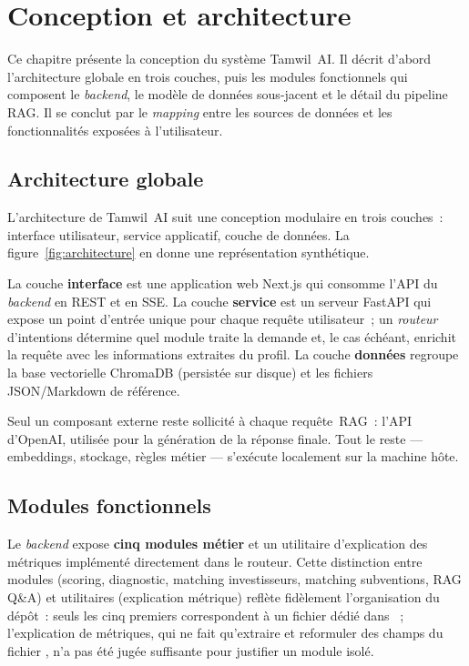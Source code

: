 \chapter{Conception et architecture}

Ce chapitre présente la conception du système Tamwil~AI. Il décrit d'abord l'architecture globale en trois couches, puis les modules fonctionnels qui composent le \textit{backend}, le modèle de données sous-jacent et le détail du pipeline \ac{RAG}. Il se conclut par le \textit{mapping} entre les sources de données et les fonctionnalités exposées à l'utilisateur.

\section{Architecture globale}

L'architecture de Tamwil~AI suit une conception modulaire en trois couches~: interface utilisateur, service applicatif, couche de données. La figure~\ref{fig:architecture} en donne une représentation synthétique.



La couche \textbf{interface} est une application web Next.js qui consomme l'\ac{API} du \textit{backend} en REST et en \ac{SSE}. La couche \textbf{service} est un serveur FastAPI qui expose un point d'entrée unique pour chaque requête utilisateur~; un \textit{routeur} d'intentions détermine quel module traite la demande et, le cas échéant, enrichit la requête avec les informations extraites du profil. La couche \textbf{données} regroupe la base vectorielle ChromaDB (persistée sur disque) et les fichiers \ac{JSON}/Markdown de référence.

Seul un composant externe reste sollicité à chaque requête~\ac{RAG}~: l'API d'OpenAI, utilisée pour la génération de la réponse finale. Tout le reste --- embeddings, stockage, règles métier --- s'exécute localement sur la machine hôte.

\section{Modules fonctionnels}

Le \textit{backend} expose \textbf{cinq modules métier} et un utilitaire d'explication des métriques implémenté directement dans le routeur. Cette distinction entre modules (scoring, diagnostic, matching investisseurs, matching subventions, \ac{RAG} Q\&A) et utilitaires (explication métrique) reflète fidèlement l'organisation du dépôt~: seuls les cinq premiers correspondent à un fichier dédié dans ~; l'explication de métriques, qui ne fait qu'extraire et reformuler des champs du fichier , n'a pas été jugée suffisante pour justifier un module isolé.

